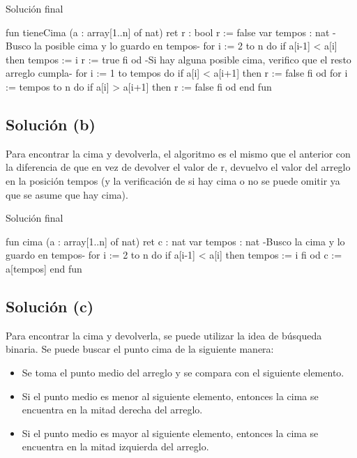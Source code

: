 \begin{codebox}{Solución final}
\begin{pascallike}
fun tieneCima (a : array[1..n] of nat) ret r : bool
    r := false
    var tempos : nat
    {-Busco la posible cima y lo guardo en tempos-}
    for i := 2 to n do
        if a[i-1] < a[i] then
            tempos := i
            r := true
        fi
    od
    {-Si hay alguna posible cima, verifico que el resto arreglo cumpla-}
    for i := 1 to tempos do
        if a[i] < a[i+1] then
            r := false
        fi
    od
    for i := tempos to n do
        if a[i] > a[i+1] then
            r := false
        fi
    od
end fun
\end{pascallike}
\end{codebox}

\subsection{Solución (b)}
Para encontrar la cima y devolverla, el algoritmo es el mismo que el anterior con la diferencia de que en vez de devolver el valor de r, devuelvo el valor del arreglo en la posición tempos (y la verificación de si hay cima o no se puede omitir ya que se asume que hay cima).

\begin{codebox}{Solución final}
\begin{pascallike}
fun cima (a : array[1..n] of nat) ret c : nat
    var tempos : nat
    {-Busco la cima y lo guardo en tempos-}
    for i := 2 to n do
        if a[i-1] < a[i] then
            tempos := i
        fi
    od
    c := a[tempos]
end fun
\end{pascallike}
\end{codebox}

\subsection{Solución (c)}
Para encontrar la cima y devolverla, se puede utilizar la idea de búsqueda binaria. Se puede buscar el punto cima de la siguiente manera:

\begin{itemize}
    \item Se toma el punto medio del arreglo y se compara con el siguiente elemento.
    \item Si el punto medio es menor al siguiente elemento, entonces la cima se encuentra en la mitad derecha del arreglo.
    \item Si el punto medio es mayor al siguiente elemento, entonces la cima se encuentra en la mitad izquierda del arreglo.
\end{itemize}


